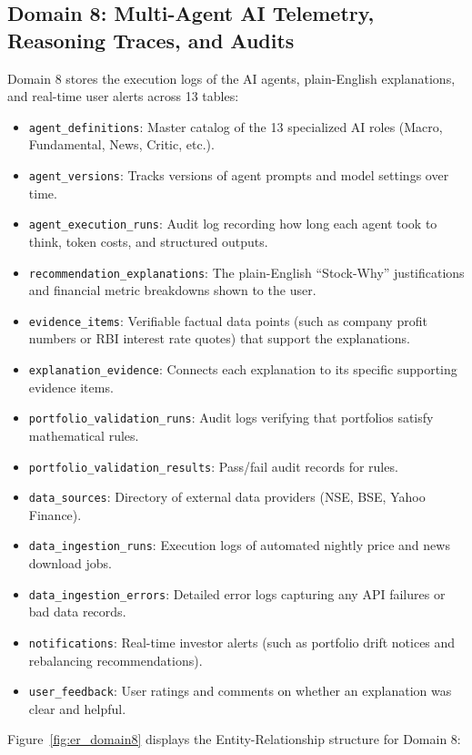 \subsection{Domain 8: Multi-Agent AI Telemetry, Reasoning Traces, and Audits}
Domain 8 stores the execution logs of the AI agents, plain-English explanations, and real-time user alerts across 13 tables:
\begin{itemize}
    \item \texttt{agent\_definitions}: Master catalog of the 13 specialized AI roles (Macro, Fundamental, News, Critic, etc.).
    \item \texttt{agent\_versions}: Tracks versions of agent prompts and model settings over time.
    \item \texttt{agent\_execution\_runs}: Audit log recording how long each agent took to think, token costs, and structured outputs.
    \item \texttt{recommendation\_explanations}: The plain-English ``Stock-Why'' justifications and financial metric breakdowns shown to the user.
    \item \texttt{evidence\_items}: Verifiable factual data points (such as company profit numbers or RBI interest rate quotes) that support the explanations.
    \item \texttt{explanation\_evidence}: Connects each explanation to its specific supporting evidence items.
    \item \texttt{portfolio\_validation\_runs}: Audit logs verifying that portfolios satisfy mathematical rules.
    \item \texttt{portfolio\_validation\_results}: Pass/fail audit records for rules.
    \item \texttt{data\_sources}: Directory of external data providers (NSE, BSE, Yahoo Finance).
    \item \texttt{data\_ingestion\_runs}: Execution logs of automated nightly price and news download jobs.
    \item \texttt{data\_ingestion\_errors}: Detailed error logs capturing any API failures or bad data records.
    \item \texttt{notifications}: Real-time investor alerts (such as portfolio drift notices and rebalancing recommendations).
    \item \texttt{user\_feedback}: User ratings and comments on whether an explanation was clear and helpful.
\end{itemize}

Figure~\ref{fig:er_domain8} displays the Entity-Relationship structure for Domain 8:

